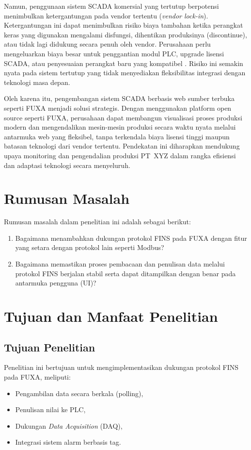 Namun, penggunaan sistem SCADA komersial yang tertutup berpotensi menimbulkan ketergantungan pada vendor tertentu (\textit{vendor lock-in}). Ketergantungan ini dapat menimbulkan risiko biaya tambahan ketika perangkat keras yang digunakan mengalami disfungsi, dihentikan produksinya (discontinue), atau tidak lagi didukung secara penuh oleh vendor. Perusahaan perlu mengeluarkan biaya besar untuk penggantian modul PLC, upgrade lisensi SCADA, atau penyesuaian perangkat baru yang kompatibel \parencite{banthia2024vendorlockin}. Risiko ini semakin nyata pada sistem tertutup yang tidak menyediakan fleksibilitas integrasi dengan teknologi masa depan.

Oleh karena itu, pengembangan sistem SCADA berbasis web sumber terbuka seperti FUXA menjadi solusi strategis. Dengan menggunakan platform open source seperti FUXA, perusahaan dapat membangun visualisasi proses produksi modern dan mengendalikan mesin-mesin produksi secara waktu nyata melalui antarmuka web yang fleksibel, tanpa terkendala biaya lisensi tinggi maupun batasan teknologi dari vendor tertentu. Pendekatan ini diharapkan mendukung upaya monitoring dan pengendalian produksi PT~XYZ dalam rangka efisiensi dan adaptasi teknologi secara menyeluruh.


\section{Rumusan Masalah}
Rumusan masalah dalam penelitian ini adalah sebagai berikut:
\begin{enumerate}
    \item Bagaimana menambahkan dukungan protokol FINS pada FUXA dengan fitur yang setara dengan protokol lain seperti Modbus?
    \item Bagaimana memastikan proses pembacaan dan penulisan data melalui protokol FINS berjalan stabil serta dapat ditampilkan dengan benar pada antarmuka pengguna (UI)?
\end{enumerate}

\section{Tujuan dan Manfaat Penelitian}
\subsection{Tujuan Penelitian}
Penelitian ini bertujuan untuk mengimplementasikan dukungan protokol FINS pada FUXA, meliputi:
\begin{itemize}
    \item Pengambilan data secara berkala (polling),
    \item Penulisan nilai ke PLC,
    \item Dukungan \textit{Data Acquisition} (DAQ),
    \item Integrasi sistem alarm berbasis tag.
\end{itemize}

